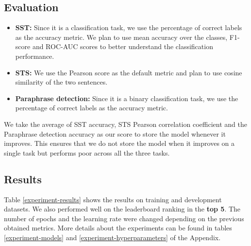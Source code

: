 \documentclass{article}
\begin{document}
\subsection{Evaluation}
\begin{itemize}
    \item \textbf{SST:} Since it is a classification task, we use the percentage of correct labels as the accuracy metric. We plan to use mean accuracy over the classes, F1-score and ROC-AUC scores to better understand the classification performance. 
    \item \textbf{STS:} We use the Pearson score as the default metric and plan to use cosine similarity of the two sentences. 
    \item \textbf{Paraphrase detection:} Since it is a binary classification task, we use the percentage of correct labels as the accuracy metric.
\end{itemize}

We take the average of SST accuracy, STS Pearson correlation coefficient and the Paraphrase detection accuracy as our score to store the model whenever it improves. This ensures that we do not store the model when it improves on a single task but performs poor across all the three tasks.  



\subsection{Results}

Table \ref{experiment-results} shows the results on training and development datasets. We also performed well on the leaderboard ranking in the \textbf{top 5}. The number of epochs and the learning rate were changed depending on the previous obtained metrics. More details about the experiments can be found in tables \ref{experiment-models} and \ref{experiment-hyperparameters} of the Appendix.
\end{document}
